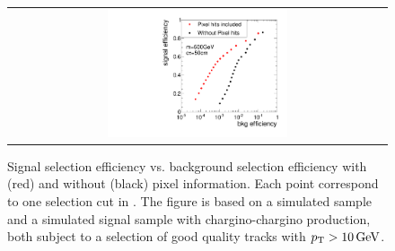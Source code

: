 \begin{figure}[!bt]
\begin{tabular}{c}
    \includegraphics[width=0.49\textwidth]{figures/analysis/rocplot_wjets_mass_500GeV_ctau_50cm.pdf}
  \end{tabular}
  \caption{Signal selection efficiency vs. background selection efficiency with (red) and without (black) pixel information.
           Each point correspond to one selection cut in \ias.
           The figure is based on a simulated \WJets sample and a simulated signal sample with chargino-chargino production, both subject to a selection of good quality tracks with $p_{\text{T}}>10\,\text{Ge}\kern-0.06667em\text{V}$.
       }
  \vspace{40pt}
  \label{fig:ROCplots}
\end{figure} 
